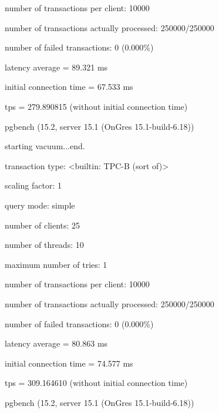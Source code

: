number of transactions per client: 10000

number of transactions actually processed: 250000/250000

number of failed transactions: 0 (0.000\%)

latency average = 89.321 ms

initial connection time = 67.533 ms

tps = 279.890815 (without initial connection time)


pgbench (15.2, server 15.1 (OnGres 15.1-build-6.18))

starting vacuum...end.

transaction type: <builtin: TPC-B (sort of)>

scaling factor: 1

query mode: simple

number of clients: 25

number of threads: 10

maximum number of tries: 1

number of transactions per client: 10000

number of transactions actually processed: 250000/250000

number of failed transactions: 0 (0.000\%)

latency average = 80.863 ms

initial connection time = 74.577 ms

tps = 309.164610 (without initial connection time)

pgbench (15.2, server 15.1 (OnGres 15.1-build-6.18))

